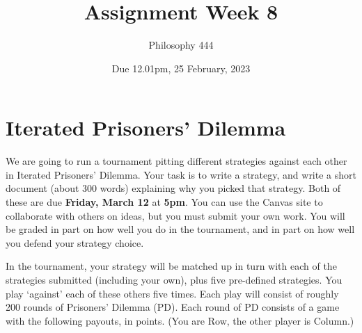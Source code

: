 \documentclass[
  11pt,
]{article}
\title{Assignment Week 8}
\author{Philosophy 444}
\date{Due 12.01pm, 25 February, 2023}
\begin{document}
\maketitle

\hypertarget{iterated-prisoners-dilemma}{%
\section{Iterated Prisoners' Dilemma}\label{iterated-prisoners-dilemma}}

We are going to run a tournament pitting different strategies against
each other in Iterated Prisoners' Dilemma. Your task is to write a
strategy, and write a short document (about 300 words) explaining why
you picked that strategy. Both of these are due \textbf{Friday, March
12} at \textbf{5pm}. You can use the Canvas site to collaborate with
others on ideas, but you must submit your own work. You will be graded
in part on how well you do in the tournament, and in part on how well
you defend your strategy choice.

In the tournament, your strategy will be matched up in turn with each of
the strategies submitted (including your own), plus five pre-defined
strategies. You play `against' each of these others five times. Each
play will consist of roughly 200 rounds of Prisoners' Dilemma (PD). Each
round of PD consists of a game with the following payouts, in points.
(You are Row, the other player is Column.)

 
  \providecommand{\huxb}[2]{\arrayrulecolor[RGB]{#1}\global\arrayrulewidth=#2pt}
  \providecommand{\huxvb}[2]{\color[RGB]{#1}\vrule width #2pt}
  \providecommand{\huxtpad}[1]{\rule{0pt}{#1}}
  \providecommand{\huxbpad}[1]{\rule[-#1]{0pt}{#1}}
\end{document}
